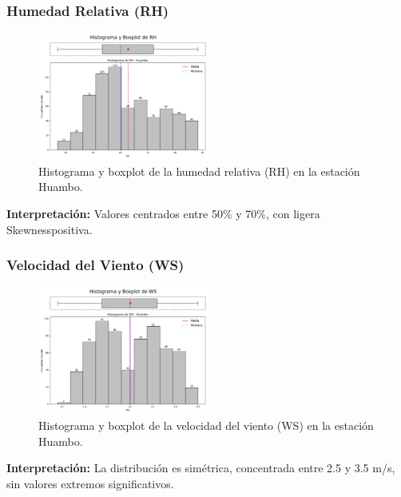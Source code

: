 \subsubsection*{Humedad Relativa (RH)}
\begin{figure}[H]
\centering
\includegraphics[width=0.5\textwidth]{resultados/por_estacion_meteorologica/Huambo/RH_histograma.png}
\caption{Histograma y boxplot de la humedad relativa (RH) en la estación Huambo.}
\label{fig:huambo_RH}
\end{figure}
\textbf{Interpretación:} Valores centrados entre 50\% y 70\%, con ligera Skewnesspositiva.

\subsubsection*{Velocidad del Viento (WS)}
\begin{figure}[H]
\centering
\includegraphics[width=0.5\textwidth]{resultados/por_estacion_meteorologica/Huambo/WS_histograma.png}
\caption{Histograma y boxplot de la velocidad del viento (WS) en la estación Huambo.}
\label{fig:huambo_WS}
\end{figure}
\textbf{Interpretación:} La distribución es simétrica, concentrada entre 2.5 y 3.5 m/s, sin valores extremos significativos.

